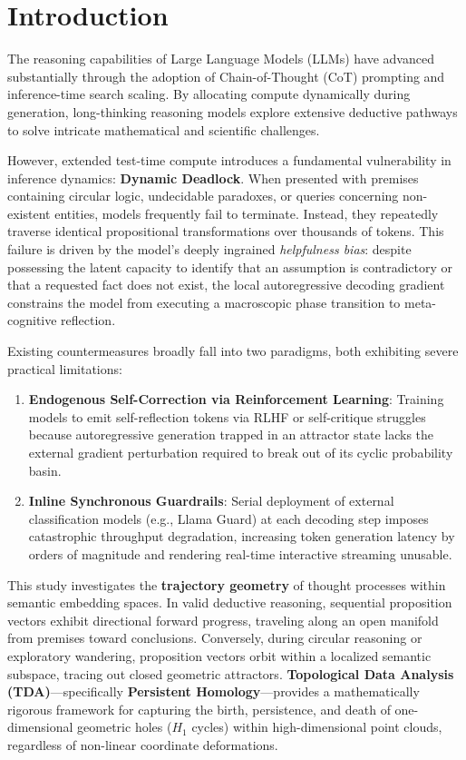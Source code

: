 \documentclass[11pt,a4paper]{article}
\begin{document}
\vspace{1em}

\section{Introduction}

The reasoning capabilities of Large Language Models (LLMs) have advanced substantially through the adoption of Chain-of-Thought (CoT) prompting and inference-time search scaling. By allocating compute dynamically during generation, long-thinking reasoning models explore extensive deductive pathways to solve intricate mathematical and scientific challenges.

However, extended test-time compute introduces a fundamental vulnerability in inference dynamics: \textbf{Dynamic Deadlock}. When presented with premises containing circular logic, undecidable paradoxes, or queries concerning non-existent entities, models frequently fail to terminate. Instead, they repeatedly traverse identical propositional transformations over thousands of tokens. This failure is driven by the model's deeply ingrained \textit{helpfulness bias}: despite possessing the latent capacity to identify that an assumption is contradictory or that a requested fact does not exist, the local autoregressive decoding gradient constrains the model from executing a macroscopic phase transition to meta-cognitive reflection.

Existing countermeasures broadly fall into two paradigms, both exhibiting severe practical limitations:
\begin{enumerate}
    \item \textbf{Endogenous Self-Correction via Reinforcement Learning}: Training models to emit self-reflection tokens via RLHF or self-critique struggles because autoregressive generation trapped in an attractor state lacks the external gradient perturbation required to break out of its cyclic probability basin.
    \item \textbf{Inline Synchronous Guardrails}: Serial deployment of external classification models (e.g., Llama Guard) at each decoding step imposes catastrophic throughput degradation, increasing token generation latency by orders of magnitude and rendering real-time interactive streaming unusable.
\end{enumerate}

This study investigates the \textbf{trajectory geometry} of thought processes within semantic embedding spaces. In valid deductive reasoning, sequential proposition vectors exhibit directional forward progress, traveling along an open manifold from premises toward conclusions. Conversely, during circular reasoning or exploratory wandering, proposition vectors orbit within a localized semantic subspace, tracing out closed geometric attractors. \textbf{Topological Data Analysis (TDA)}---specifically \textbf{Persistent Homology}---provides a mathematically rigorous framework for capturing the birth, persistence, and death of one-dimensional geometric holes ($H_1$ cycles) within high-dimensional point clouds, regardless of non-linear coordinate deformations.
\end{document}

